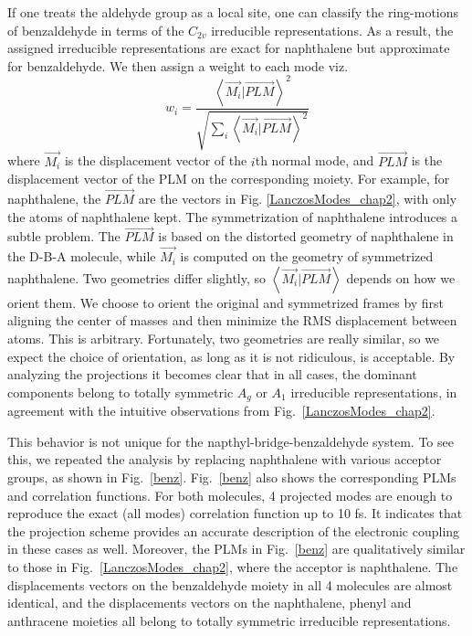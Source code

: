 If one treats the aldehyde group as a local site, one can classify the ring-motions of
benzaldehyde in terms of the $C_{2v}$ irreducible representations.
As a result, the assigned irreducible representations are exact for naphthalene but approximate for benzaldehyde.
We then assign a weight to each mode viz.
$$
w_i = \frac{\left\langle \overrightarrow{M_{i}}|\overrightarrow{PLM}\right\rangle ^{2}}{\sqrt{\sum_{i}\left\langle \overrightarrow{M_{i}}|\overrightarrow{PLM}\right\rangle ^{2}}}
$$
where $\overrightarrow{M_{i}}$ is the displacement vector of the $i$th normal mode, and $\overrightarrow{PLM}$ is the displacement vector of the PLM on the corresponding moiety. For example, for naphthalene, the $\overrightarrow{PLM}$ are the vectors in Fig. \ref{LanczosModes_chap2}, with only the atoms of naphthalene kept.
The symmetrization of naphthalene introduces a subtle problem. The $\overrightarrow{PLM}$  is based on the distorted geometry of naphthalene in the D-B-A molecule, while $\overrightarrow{M_{i}}$ is computed on the geometry of symmetrized naphthalene. Two geometries differ slightly, so $\left\langle \overrightarrow{M_{i}}|\overrightarrow{PLM}\right\rangle$ depends on how we orient them.
We choose to orient the original and symmetrized frames by first aligning the center of masses
and then minimize the RMS displacement between atoms. This is arbitrary. Fortunately, two geometries are really similar, so we expect the choice of orientation, as long as it is not ridiculous, is acceptable.
By analyzing the projections it becomes clear that in all cases, the dominant components
belong to totally symmetric $A_{g}$ or $A_1$ irreducible representations,  in agreement
with the intuitive observations from Fig.~\ref{LanczosModes_chap2}.

This behavior is not unique for the napthyl-bridge-benzaldehyde  system.
To see this, we repeated the analysis by replacing naphthalene with various acceptor groups, as shown in Fig.~\ref{benz}. Fig.~\ref{benz} also shows the corresponding PLMs and correlation functions.
For both molecules,  4 projected modes are enough to reproduce the exact (all modes) correlation function up to 10 fs. It indicates that
the projection scheme provides an accurate description of the electronic coupling in  these cases as well.
Moreover, the PLMs in Fig.~\ref{benz} are qualitatively similar to those in Fig.~\ref{LanczosModes_chap2}, where the acceptor is naphthalene.
The displacements vectors on the benzaldehyde moiety in all 4 molecules are almost identical, and  the displacements vectors on the naphthalene, phenyl and anthracene moieties all belong to totally symmetric irreducible representations.

